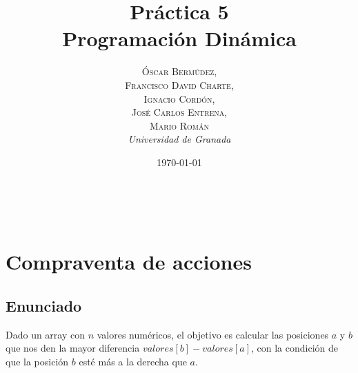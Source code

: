 \documentclass[a4paper, 11pt]{article} %
\title{\textbf{Práctica 5}\\ %
Programación Dinámica} %
\author{\textsc{Óscar Bermúdez,\\Francisco David Charte,\\Ignacio Cordón,\\José Carlos Entrena,\\Mario Román} %
\\{\textit{Universidad de Granada}}} %
\date{\today} %
\makeatletter
\renewcommand{\maketitle}{ %
\begin{flushright} %
{\LARGE\@title} %

\vspace{50pt} %

{\large\@author} %
\\\@date %

\vspace{40pt} %
\end{flushright}
}
\makeatother
\begin{document}
\maketitle %



\renewcommand{\abstractname}{Resumen} %





{\parskip=2pt
  \tableofcontents
}
\pagebreak



\section{Compraventa de acciones}
	\subsection{Enunciado}
      Dado un array con $n$ valores numéricos, el objetivo es calcular las posiciones $a$ y $b$ que nos den la mayor diferencia $valores[b]-valores[a]$, con la condición de que la posición $b$ esté más a la derecha que $a$.
      
\end{document}
